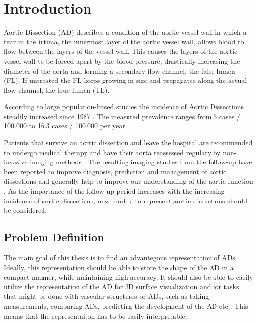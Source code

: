 \documentclass[thesis.tex]{subfiles}
\begin{document}
\chapter{Introduction}
\label{chap:introduction}
Aortic Dissection (AD) describes a condition of the aortic vessel wall in which a tear in the intima, the innermost layer of the aortic vessel wall, allows blood to flow between the layers of the vessel wall. This causes the layers of the aortic vessel wall to be forced apart by the blood pressure, drastically increasing the diameter of the aorta and forming a secondary flow channel, the false lumen (FL). If untreated the FL keeps growing in size and propagates along the actual flow channel, the true lumen (TL).

According to large population-based studies the incidence of Aortic Dissections steadily increased since 1987 \cite{olsson2007thoracic}. The measured prevalence ranges from 6 cases / 100.000 to 16.3 cases / 100.000 per year \cite{olsson2007thoracic,goldfinger2014thoracic}. 

Patients that survive an aortic dissection and leave the hospital are recommended to undergo medical therapy and have their aorta reassessed regulary by non-invasive imaging methods \cite{olsson2007thoracic,desanctis1987aortic,baliga2014role}. The resulting imaging studies from the follow-up have been reported to improve diagnosis, prediction and management of aortic dissections \cite{doi:10.1161/CIRCULATIONAHA.117.031264} and generally help to improve our understanding of the aortic function \cite{baliga2014role}. As the importance of the follow-up period increases with the increasing incidence of aortic dissections, new models to represent aortic dissections should be considered. 


\section{Problem Definition} \label{problem_def}

The main goal of this thesis is to find an advantegous representation of ADs. Ideally, this representation should be able to store the shape of the AD in a compact manner, while maintaining high accuracy. It should also be able to easily utilize the representation of the AD for 3D surface visualization and for tasks that might be done with vascular structures or ADs, such as taking measurements, comparing ADs, predicting the development of the AD etc.. This means that the representaiton has to be easily interpretable.
\end{document}
